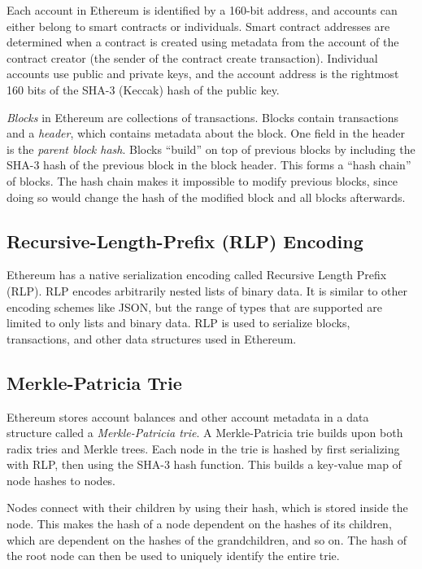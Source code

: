 \documentclass[12pt]{article}
\begin{document}
Each account in Ethereum is identified by a 160-bit address, and accounts can either belong to smart contracts or individuals. Smart contract addresses are determined when a contract is created using metadata from the account of the contract creator (the sender of the contract create transaction). Individual accounts use public and private keys, and the account address is the rightmost 160 bits of the SHA-3 (Keccak) hash of the public key. %

\emph{Blocks} in Ethereum are collections of transactions. Blocks contain transactions and a \emph{header}, which contains metadata about the block. One field in the header is the \emph{parent block hash}. Blocks ``build'' on top of previous blocks by including the SHA-3 hash of the previous block in the block header. This forms a ``hash chain'' of blocks. The hash chain makes it impossible to modify previous blocks, since doing so would change the hash of the modified block and all blocks afterwards.

\subsection{Recursive-Length-Prefix (RLP) Encoding}

Ethereum has a native serialization encoding called Recursive Length Prefix (RLP). RLP encodes arbitrarily nested lists of binary data. It is similar to other encoding schemes like JSON, but the range of types that are supported are limited to only lists and binary data. RLP is used to serialize blocks, transactions, and other data structures used in Ethereum.

\subsection{Merkle-Patricia Trie}

Ethereum stores account balances and other account metadata in a data structure called a \emph{Merkle-Patricia trie}. A Merkle-Patricia trie builds upon both radix tries and Merkle trees. Each node in the trie is hashed by first serializing with RLP, then using the SHA-3 hash function. This builds a key-value map of node hashes to nodes.


Nodes connect with their children by using their hash, which is stored inside the node. This makes the hash of a node dependent on the hashes of its children, which are dependent on the hashes of the grandchildren, and so on. The hash of the root node can then be used to uniquely identify the entire trie.
\end{document}
